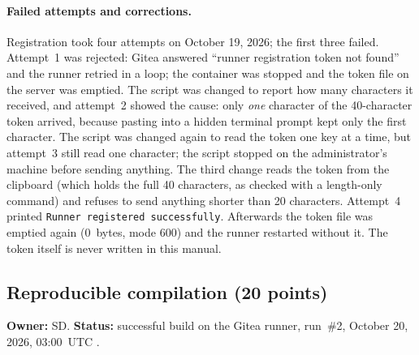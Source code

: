 \begin{longlisting}
\inputminted[fontsize=\scriptsize]{yaml}{config/runner/config.yaml}
\caption{Runner configuration (non-secret): one job at a time, no cache server, no privileged jobs, never re-pull the local image.}
\label{Listing:RunnerConfig}
\end{longlisting}

\paragraph{Failed attempts and corrections.}
Registration took four attempts on October 19, 2026; the first three failed. Attempt~1 was rejected: Gitea
answered ``runner registration token not found'' and the runner retried in a loop; the container was stopped and
the token file on the server was emptied. The script was changed to report how many characters it received, and
attempt~2 showed the cause: only \emph{one} character of the 40-character token arrived, because pasting into a
hidden terminal prompt kept only the first character. The script was changed again to read the token one key at a
time, but attempt~3 still read one character; the script stopped on the administrator's machine before sending
anything. The third change reads the token from the clipboard (which holds the full 40 characters, as checked
with a length-only command) and refuses to send anything shorter than 20 characters. Attempt~4 printed
\texttt{Runner registered successfully}. Afterwards the token file was emptied again (0~bytes, mode 600) and the
runner restarted without it. The token itself is never written in this manual.

\subsection{Reproducible compilation (20 points)}
\label{Section:buildCompilation}
\textbf{Owner:} SD. \textbf{Status:} successful build on the Gitea runner,
run~\#2, October 20, 2026, 03:00~UTC \StatusPass.

